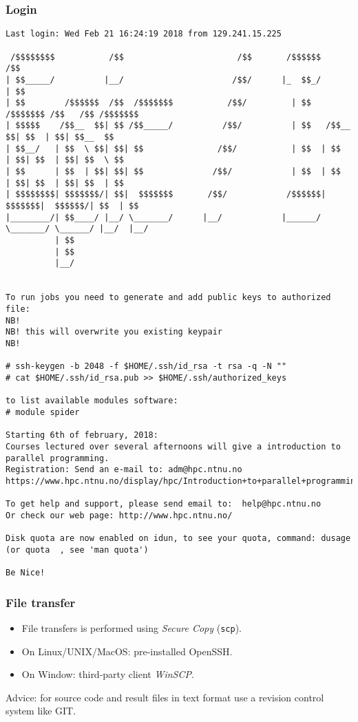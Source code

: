 \begin{frame}[fragile]
  \frametitle{Login}
\tiny{
\begin{lstlisting}[style=shell]
Last login: Wed Feb 21 16:24:19 2018 from 129.241.15.225

 /$$$$$$$$           /$$                       /$$       /$$$$$$       /$$                    
| $$_____/          |__/                      /$$/      |_  $$_/      | $$                    
| $$        /$$$$$$  /$$  /$$$$$$$           /$$/         | $$    /$$$$$$$ /$$   /$$ /$$$$$$$ 
| $$$$$    /$$__  $$| $$ /$$_____/          /$$/          | $$   /$$__  $$| $$  | $$| $$__  $$
| $$__/   | $$  \ $$| $$| $$               /$$/           | $$  | $$  | $$| $$  | $$| $$  \ $$
| $$      | $$  | $$| $$| $$              /$$/            | $$  | $$  | $$| $$  | $$| $$  | $$
| $$$$$$$$| $$$$$$$/| $$|  $$$$$$$       /$$/            /$$$$$$|  $$$$$$$|  $$$$$$/| $$  | $$
|________/| $$____/ |__/ \_______/      |__/            |______/ \_______/ \______/ |__/  |__/
          | $$                                                                                
          | $$                                                                                
          |__/                      


To run jobs you need to generate and add public keys to authorized file:
NB!
NB! this will overwrite you existing keypair
NB!

# ssh-keygen -b 2048 -f $HOME/.ssh/id_rsa -t rsa -q -N ""
# cat $HOME/.ssh/id_rsa.pub >> $HOME/.ssh/authorized_keys

to list available modules software:
# module spider

Starting 6th of february, 2018:
Courses lectured over several afternoons will give a introduction to parallel programming.
Registration: Send an e-mail to: adm@hpc.ntnu.no
https://www.hpc.ntnu.no/display/hpc/Introduction+to+parallel+programming

To get help and support, please send email to:  help@hpc.ntnu.no
Or check our web page: http://www.hpc.ntnu.no/

Disk quota are now enabled on idun, to see your quota, command: dusage 
(or quota  , see 'man quota')

Be Nice!
\end{lstlisting}
}
\end{frame}

\begin{frame}
  \frametitle{File transfer}
  \begin{itemize}
  \item File transfers is performed using \emph{Secure Copy} (\texttt{scp}).
  \item On Linux/UNIX/MacOS: pre-installed OpenSSH.
  \item On Window: third-party client \emph{WinSCP}.
  \end{itemize}

\bigskip
Advice: for source code and result files in text format use a revision control system like GIT.

\end{frame}

